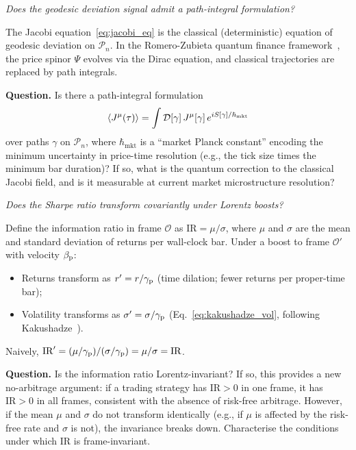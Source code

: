 \begin{openquestion}
\label{oq:quantum_corrections}
\emph{Does the geodesic deviation signal admit a path-integral formulation?}

The Jacobi equation~\eqref{eq:jacobi_eq} is the classical (deterministic)
equation of geodesic deviation on $\mathcal{P}_n$.  In the Romero-Zubieta
quantum finance framework~\cite{Romero2016}, the price spinor $\Psi$ evolves
via the Dirac equation, and classical trajectories are replaced by path integrals.

\textbf{Question.}  Is there a path-integral formulation
\begin{equation}
  \langle J^\mu(\tau) \rangle
  = \int \mathcal{D}[\gamma] \, J^\mu[\gamma] \, e^{iS[\gamma]/\hbar_{\mathrm{mkt}}}
\end{equation}
over paths $\gamma$ on $\mathcal{P}_n$, where $\hbar_{\mathrm{mkt}}$ is a
``market Planck constant'' encoding the minimum uncertainty in price-time
resolution (e.g., the tick size times the minimum bar duration)?  If so, what
is the quantum correction to the classical Jacobi field, and is it measurable
at current market microstructure resolution?
\end{openquestion}

\begin{openquestion}
\label{oq:ir_gamma}
\emph{Does the Sharpe ratio transform covariantly under Lorentz boosts?}

Define the information ratio in frame $\mathcal{O}$ as
$\mathrm{IR} = \mu / \sigma$, where $\mu$ and $\sigma$ are the mean and
standard deviation of returns per wall-clock bar.  Under a boost to frame
$\mathcal{O}'$ with velocity $\beta_{\mathrm{p}}$:
\begin{itemize}
  \item Returns transform as $r' = r / \gamma_{\mathrm{p}}$ (time dilation; fewer returns
        per proper-time bar);
  \item Volatility transforms as $\sigma' = \sigma / \gamma_{\mathrm{p}}$
        (Eq.~\ref{eq:kakushadze_vol}, following Kakushadze~\cite{Kakushadze2017}).
\end{itemize}
Naively, $\mathrm{IR}' = (\mu/\gamma_{\mathrm{p}}) / (\sigma/\gamma_{\mathrm{p}}) = \mu/\sigma = \mathrm{IR}$.

\textbf{Question.}  Is the information ratio Lorentz-invariant?  If so,
this provides a new no-arbitrage argument: if a trading strategy has
$\mathrm{IR} > 0$ in one frame, it has $\mathrm{IR} > 0$ in all frames,
consistent with the absence of risk-free arbitrage.  However, if the
mean $\mu$ and $\sigma$ do not transform identically (e.g., if $\mu$
is affected by the risk-free rate and $\sigma$ is not), the invariance
breaks down.  Characterise the conditions under which $\mathrm{IR}$ is
frame-invariant.
\end{openquestion}

